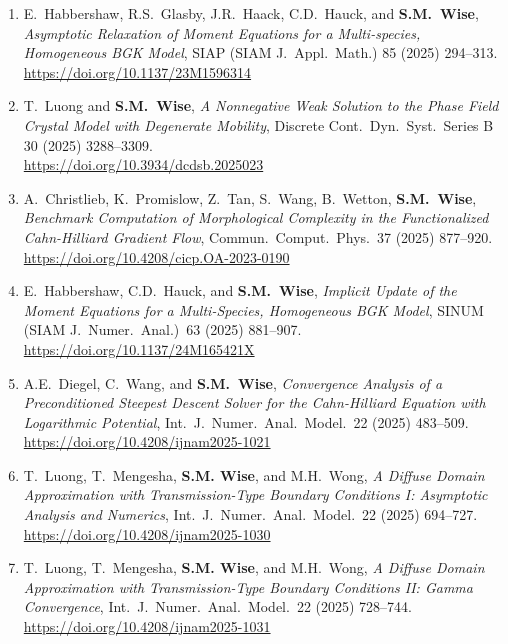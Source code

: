 \documentclass[10pt,letterpaper]{article}
\begin{document}
\begin{enumerate}
	\item
E.~Habbershaw, R.S.~Glasby, J.R.~Haack, C.D.~Hauck, and \textbf{S.M.~Wise}, {\sl Asymptotic Relaxation of Moment Equations for a Multi-species, Homogeneous BGK Model}, SIAP (SIAM J.~Appl.~Math.) 85 (2025) 294--313.
	\\
\url{https://doi.org/10.1137/23M1596314}

	\item
T.~Luong and \textbf{S.M.~Wise}, {\sl A Nonnegative Weak Solution to the Phase Field Crystal Model with Degenerate Mobility}, Discrete Cont.~Dyn.~Syst.~Series B 30 (2025) 3288--3309.
	\\
\url{https://doi.org/10.3934/dcdsb.2025023}

	\item
A.~Christlieb, K.~Promislow, Z.~Tan, S.~Wang, B.~Wetton, \textbf{S.M.~Wise}, {\sl Benchmark Computation of Morphological Complexity in the Functionalized Cahn-Hilliard Gradient Flow}, Commun.~Comput.~Phys.~37 (2025) 877--920.
	\\ 
\url{https://doi.org/10.4208/cicp.OA-2023-0190}


	\item
E.~Habbershaw, C.D.~Hauck, and \textbf{S.M.~Wise}, {\sl Implicit Update of the Moment Equations for a Multi-Species, Homogeneous BGK Model}, SINUM (SIAM J.~Numer.~Anal.)~63 (2025) 881--907.
	\\
\url{https://doi.org/10.1137/24M165421X}

	\item
A.E.~Diegel, C.~Wang, and \textbf{S.M.~Wise}, {\sl Convergence Analysis of a Preconditioned Steepest Descent Solver for the Cahn-Hilliard Equation with Logarithmic Potential}, Int.~J.~Numer.~Anal.~Model.~22 (2025) 483--509.
	\\
\url{https://doi.org/10.4208/ijnam2025-1021}

	\item
T.~Luong, T.~Mengesha, \textbf{S.M. Wise}, and M.H.~Wong, {\sl  A Diffuse Domain Approximation with Transmission-Type Boundary Conditions I: Asymptotic Analysis and Numerics}, Int.~J.~Numer.~Anal.~Model.~22 (2025) 694--727.
	\\
\url{https://doi.org/10.4208/ijnam2025-1030}

	\item
T.~Luong, T.~Mengesha, \textbf{S.M. Wise}, and M.H.~Wong, {\sl  A Diffuse Domain Approximation with Transmission-Type Boundary Conditions II: Gamma Convergence}, Int.~J.~Numer.~Anal.~Model.~22 (2025) 728--744.
	\\
\url{https://doi.org/10.4208/ijnam2025-1031}


\end{enumerate}
\end{document}
